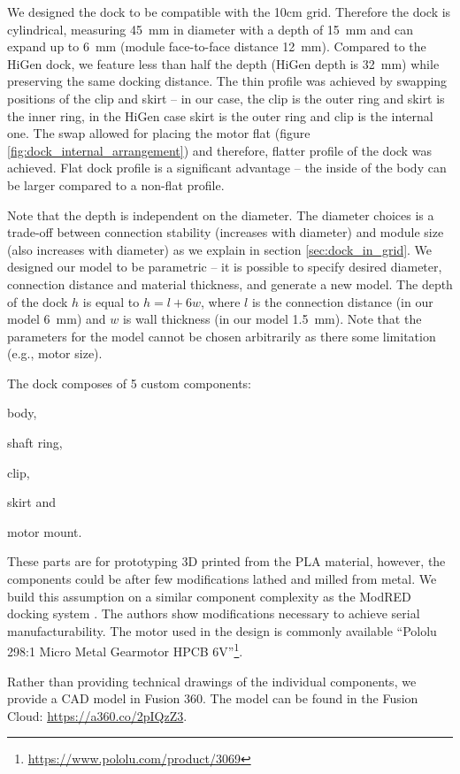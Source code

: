 We designed the dock to be compatible with the 10cm grid. Therefore the dock is
cylindrical, measuring 45~mm in diameter with a depth of 15~mm and can expand up
to 6~mm (module face-to-face distance 12~mm). Compared to the HiGen dock, we
feature less than half the depth (HiGen depth is 32~mm) while preserving the
same docking distance. The thin profile was achieved by swapping positions of
the clip and skirt -- in our case, the clip is the outer ring and skirt is the
inner ring, in the HiGen case skirt is the outer ring and clip is the internal
one. The swap allowed for placing the motor flat (figure
\ref{fig:dock_internal_arrangement}) and therefore, flatter profile of the dock
was achieved. Flat dock profile is a significant advantage -- the inside of the
body can be larger compared to a non-flat profile.

Note that the depth is independent on the diameter. The diameter choices is a
trade-off between connection stability (increases with diameter) and module size
(also increases with diameter) as we explain in section \ref{sec:dock_in_grid}.
We designed our model to be parametric -- it is possible to specify desired
diameter, connection distance and material thickness, and generate a new model.
The depth of the dock $h$ is equal to $h=l+6w$, where $l$ is the connection
distance (in our model 6~mm) and $w$ is wall thickness (in our model 1.5~mm).
Note that the parameters for the model cannot be chosen arbitrarily as there
some limitation (e.g., motor size).

The dock composes of 5 custom components:
\begin{enumerate*}
    \item body,
    \item shaft ring,
    \item clip,
    \item skirt and
    \item motor mount.
\end{enumerate*}
These parts are for prototyping 3D printed from the PLA material, however, the
components could be after few modifications lathed and milled from metal. We
build this assumption on a similar component complexity as the ModRED docking
system \cite{hossain_towards_2014}. The authors show modifications necessary to
achieve serial manufacturability. The motor used in the design is commonly
available ``Pololu 298:1 Micro Metal Gearmotor HPCB
6V''\footnote{\url{https://www.pololu.com/product/3069}}.

Rather than providing technical drawings of the individual components, we
provide a CAD model in Fusion 360. The model can be found in the Fusion Cloud:
\url{https://a360.co/2pIQzZ3}.

